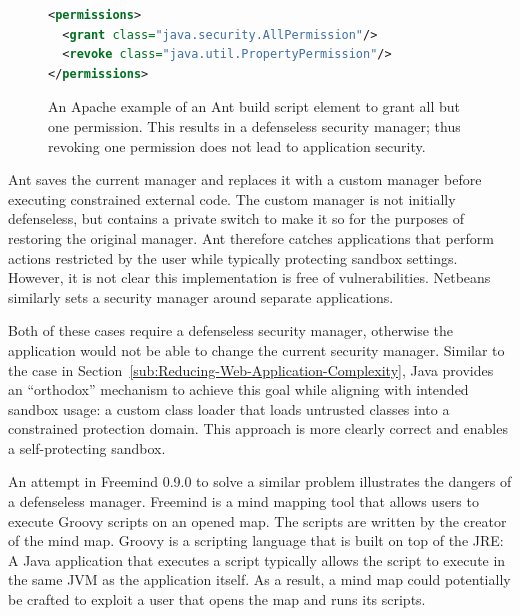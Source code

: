 \documentclass{sig-alternate}
\begin{document}
\begin{figure}
\begin{lstlisting}[language=XML,basicstyle={\scriptsize}]
<permissions>   
  <grant class="java.security.AllPermission"/>   
  <revoke class="java.util.PropertyPermission"/> 
</permissions>
\end{lstlisting}

\caption{An Apache example of an Ant build script element to grant all but
  one permission. This results in a defenseless security manager;
\label{fig:Ant Permissions Example} 
  thus revoking one permission does not lead to application security.}
\end{figure}

Ant saves the current manager and replaces it with a custom manager before
executing constrained external code.  The custom
manager is not initially defenseless, but
contains a private switch to make it so for the purposes of
restoring the original manager.  Ant therefore catches 
applications that perform actions restricted by the user while typically
protecting sandbox settings. However, it is not clear this implementation is
free of vulnerabilities. Netbeans similarly sets a security manager around 
separate applications.

Both of these cases require a defenseless security manager, otherwise
the application would not be able to change the current security manager. 
Similar to the case in Section~\ref{sub:Reducing-Web-Application-Complexity},
Java provides an ``orthodox'' mechanism to achieve this goal while aligning with
intended sandbox usage: a custom class
loader that loads untrusted classes into a constrained protection
domain.  %
This approach is more clearly correct and enables a self-protecting sandbox.

An attempt in Freemind 0.9.0 to solve a similar problem illustrates
the dangers of a defenseless manager. Freemind is a mind mapping tool
that allows users to execute Groovy scripts on an opened map. The
scripts are written by the creator of the mind map. Groovy is a scripting
language that is built on top of the JRE: A Java application that
executes a script typically allows the script to execute in the same
JVM as the application itself. As a result, a mind map could potentially
be crafted to exploit a user that opens the map and runs its scripts.
\end{document}
